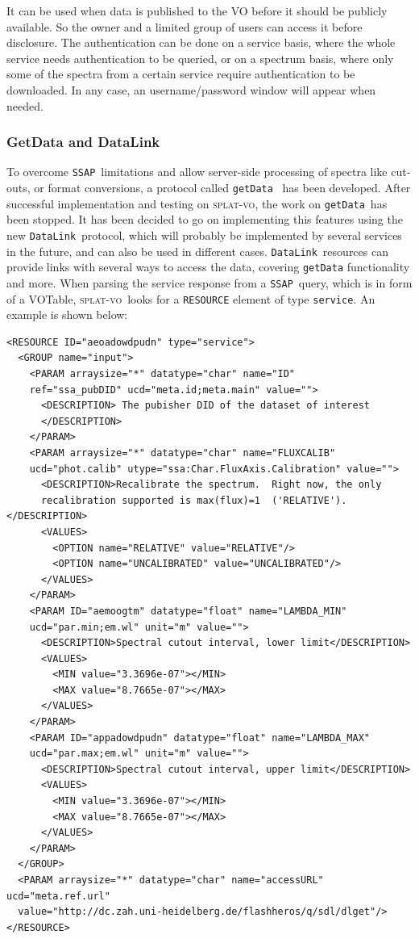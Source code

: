 \documentclass[final,authoryear,5p,times,twocolumn]{elsarticle}
\newcommand{\datalink}{\texttt{DataLink}}
\newcommand{\ssap}{\texttt{SSAP}}
\newcommand{\getdata}{\texttt{getData}}
\newcommand{\votable}{VOTable}
\newcommand{\splatvo}{\textsc{splat-vo}}
\begin{document}
It can be used when data is published to the VO before it should be
publicly available. So the owner and a limited group of users can
access it before disclosure. The authentication can be done on a
service basis, where the whole service needs authentication to be
queried, or on a spectrum basis, where only some of the spectra from a
certain service require authentication to be downloaded. In any case,
an username/password window will appear when needed.

\subsubsection{GetData and DataLink}

To overcome \ssap\ limitations and allow server-side processing of
spectra like cut-outs, or format conversions, a protocol called
\getdata\ \citep{getData}  has been developed. After successful implementation and
testing on \splatvo, the work on \getdata\ has been stopped. It has been
decided to go on implementing this features using the new \datalink\
protocol, which will probably be implemented by several services in
the future, and can also be used in different cases.  \datalink\
resources can provide links with several ways to access the data,
covering \texttt{getData} functionality and more. 
When parsing the service response from a \ssap\ query, which is in form
of a \votable, \splatvo\ looks for a \texttt{RESOURCE} element of type \texttt{service}.
An example is shown below:

{\tiny
\begin{minipage}{\textwidth}
\begin{verbatim}
<RESOURCE ID="aeoadowdpudn" type="service">
  <GROUP name="input">
    <PARAM arraysize="*" datatype="char" name="ID"
    ref="ssa_pubDID" ucd="meta.id;meta.main" value="">
      <DESCRIPTION> The pubisher DID of the dataset of interest
      </DESCRIPTION>
    </PARAM>
    <PARAM arraysize="*" datatype="char" name="FLUXCALIB"
    ucd="phot.calib" utype="ssa:Char.FluxAxis.Calibration" value="">
      <DESCRIPTION>Recalibrate the spectrum.  Right now, the only
      recalibration supported is max(flux)=1  ('RELATIVE').</DESCRIPTION>
      <VALUES>
        <OPTION name="RELATIVE" value="RELATIVE"/>
        <OPTION name="UNCALIBRATED" value="UNCALIBRATED"/>
      </VALUES>
    </PARAM>
    <PARAM ID="aemoogtm" datatype="float" name="LAMBDA_MIN"
    ucd="par.min;em.wl" unit="m" value="">
      <DESCRIPTION>Spectral cutout interval, lower limit</DESCRIPTION>
      <VALUES>
        <MIN value="3.3696e-07"></MIN>
        <MAX value="8.7665e-07"></MAX>
      </VALUES>
    </PARAM>
    <PARAM ID="appadowdpudn" datatype="float" name="LAMBDA_MAX"
    ucd="par.max;em.wl" unit="m" value="">
      <DESCRIPTION>Spectral cutout interval, upper limit</DESCRIPTION>
      <VALUES>
        <MIN value="3.3696e-07"></MIN>
        <MAX value="8.7665e-07"></MAX>
      </VALUES>
    </PARAM>
  </GROUP>
  <PARAM arraysize="*" datatype="char" name="accessURL" ucd="meta.ref.url"
  value="http://dc.zah.uni-heidelberg.de/flashheros/q/sdl/dlget"/>
</RESOURCE>
\end{verbatim}

\end{minipage}
}
\end{document}
